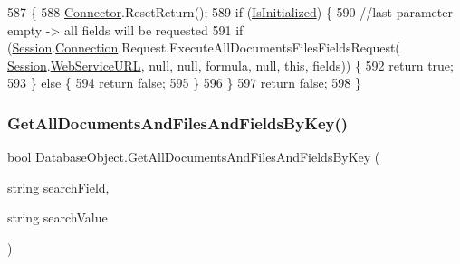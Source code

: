 \begin{DoxyCode}
587                                                                                         \{
588         \mbox{\hyperlink{class_connector}{Connector}}.ResetReturn();
589         \textcolor{keywordflow}{if} (\mbox{\hyperlink{class_database_object_a5fe036d32a30eb10d1b3f6a30263f740}{IsInitialized}}) \{
590             \textcolor{comment}{//last parameter empty -> all fields will be requested}
591             \textcolor{keywordflow}{if} (\mbox{\hyperlink{class_database_object_aa8484162b7d2a7c4c9426bca13c64c07}{Session}}.\mbox{\hyperlink{class_session_object_a014bdbf705a753540e19bfb53030c55c}{Connection}}.Request.ExecuteAllDocumentsFilesFieldsRequest(
      \mbox{\hyperlink{class_database_object_aa8484162b7d2a7c4c9426bca13c64c07}{Session}}.\mbox{\hyperlink{class_session_object_a697c071c812fbf7ad1166b896fb44c16}{WebServiceURL}}, null, null, formula, null, \textcolor{keyword}{this}, fields)) \{
592                 \textcolor{keywordflow}{return} \textcolor{keyword}{true};
593             \} \textcolor{keywordflow}{else} \{
594                 \textcolor{keywordflow}{return} \textcolor{keyword}{false};
595             \}
596         \}
597         \textcolor{keywordflow}{return} \textcolor{keyword}{false};
598     \}
\end{DoxyCode}
\mbox{\label{class_database_object_a612844c9d2bbb0b1b5013c07bf661d4a}} 
\subsubsection{\texorpdfstring{Get\+All\+Documents\+And\+Files\+And\+Fields\+By\+Key()}{GetAllDocumentsAndFilesAndFieldsByKey()}\hspace{0.1cm}{\footnotesize\ttfamily [1/2]}}
{\footnotesize\ttfamily bool Database\+Object.\+Get\+All\+Documents\+And\+Files\+And\+Fields\+By\+Key (\begin{DoxyParamCaption}\item[{string}]{search\+Field,  }\item[{string}]{search\+Value }\end{DoxyParamCaption})}



